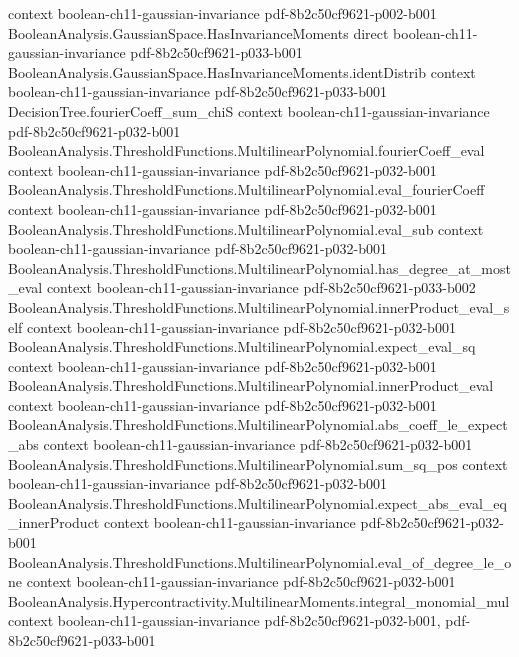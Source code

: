 \begin{theorem}
  {context}
  {boolean-ch11-gaussian-invariance}
  {pdf-8b2c50cf9621-p002-b001}
\proofstep
  {BooleanAnalysis.GaussianSpace.HasInvarianceMoments}
  {direct}
  {boolean-ch11-gaussian-invariance}
  {pdf-8b2c50cf9621-p033-b001}
\proofstep
  {BooleanAnalysis.GaussianSpace.HasInvarianceMoments.identDistrib}
  {context}
  {boolean-ch11-gaussian-invariance}
  {pdf-8b2c50cf9621-p033-b001}
\proofstep
  {DecisionTree.fourierCoeff_sum_chiS}
  {context}
  {boolean-ch11-gaussian-invariance}
  {pdf-8b2c50cf9621-p032-b001}
\proofstep
  {BooleanAnalysis.ThresholdFunctions.MultilinearPolynomial.fourierCoeff_eval}
  {context}
  {boolean-ch11-gaussian-invariance}
  {pdf-8b2c50cf9621-p032-b001}
\proofstep
  {BooleanAnalysis.ThresholdFunctions.MultilinearPolynomial.eval_fourierCoeff}
  {context}
  {boolean-ch11-gaussian-invariance}
  {pdf-8b2c50cf9621-p032-b001}
\proofstep
  {BooleanAnalysis.ThresholdFunctions.MultilinearPolynomial.eval_sub}
  {context}
  {boolean-ch11-gaussian-invariance}
  {pdf-8b2c50cf9621-p032-b001}
\proofstep
  {BooleanAnalysis.ThresholdFunctions.MultilinearPolynomial.has_degree_at_most_eval}
  {context}
  {boolean-ch11-gaussian-invariance}
  {pdf-8b2c50cf9621-p033-b002}
\proofstep
  {BooleanAnalysis.ThresholdFunctions.MultilinearPolynomial.innerProduct_eval_self}
  {context}
  {boolean-ch11-gaussian-invariance}
  {pdf-8b2c50cf9621-p032-b001}
\proofstep
  {BooleanAnalysis.ThresholdFunctions.MultilinearPolynomial.expect_eval_sq}
  {context}
  {boolean-ch11-gaussian-invariance}
  {pdf-8b2c50cf9621-p032-b001}
\proofstep
  {BooleanAnalysis.ThresholdFunctions.MultilinearPolynomial.innerProduct_eval}
  {context}
  {boolean-ch11-gaussian-invariance}
  {pdf-8b2c50cf9621-p032-b001}
\proofstep
  {BooleanAnalysis.ThresholdFunctions.MultilinearPolynomial.abs_coeff_le_expect_abs}
  {context}
  {boolean-ch11-gaussian-invariance}
  {pdf-8b2c50cf9621-p032-b001}
\proofstep
  {BooleanAnalysis.ThresholdFunctions.MultilinearPolynomial.sum_sq_pos}
  {context}
  {boolean-ch11-gaussian-invariance}
  {pdf-8b2c50cf9621-p032-b001}
\proofstep
  {BooleanAnalysis.ThresholdFunctions.MultilinearPolynomial.expect_abs_eval_eq_innerProduct}
  {context}
  {boolean-ch11-gaussian-invariance}
  {pdf-8b2c50cf9621-p032-b001}
\proofstep
  {BooleanAnalysis.ThresholdFunctions.MultilinearPolynomial.eval_of_degree_le_one}
  {context}
  {boolean-ch11-gaussian-invariance}
  {pdf-8b2c50cf9621-p032-b001}
\proofstep
  {BooleanAnalysis.Hypercontractivity.MultilinearMoments.integral_monomial_mul}
  {context}
  {boolean-ch11-gaussian-invariance}
  {pdf-8b2c50cf9621-p032-b001,
    pdf-8b2c50cf9621-p033-b001}

\end{theorem}
